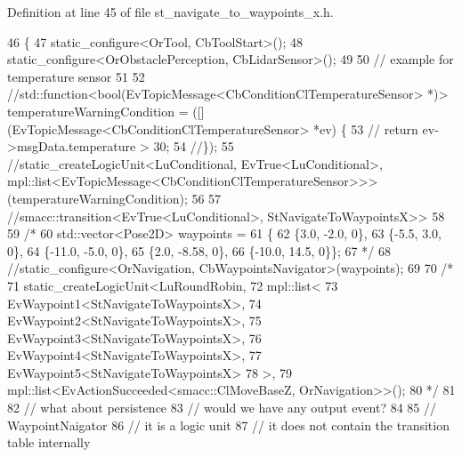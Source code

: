 Definition at line 45 of file st\+\_\+navigate\+\_\+to\+\_\+waypoints\+\_\+x.\+h.


\begin{DoxyCode}
46   \{
47     static\_configure<OrTool, CbToolStart>();
48     static\_configure<OrObstaclePerception, CbLidarSensor>();
49     
50     \textcolor{comment}{// example for temperature sensor}
51 
52     \textcolor{comment}{//std::function<bool(EvTopicMessage<CbConditionClTemperatureSensor> *)> temperatureWarningCondition =
       ([](EvTopicMessage<CbConditionClTemperatureSensor> *ev) \{}
53     \textcolor{comment}{//  return ev->msgData.temperature > 30;}
54     \textcolor{comment}{//\});}
55     \textcolor{comment}{//static\_createLogicUnit<LuConditional, EvTrue<LuConditional>,
       mpl::list<EvTopicMessage<CbConditionClTemperatureSensor>>>(temperatureWarningCondition);}
56 
57     \textcolor{comment}{//smacc::transition<EvTrue<LuConditional>, StNavigateToWaypointsX>>}
58 
59     \textcolor{comment}{/*}
60 \textcolor{comment}{    std::vector<Pose2D> waypoints =}
61 \textcolor{comment}{        \{}
62 \textcolor{comment}{            \{3.0, -2.0, 0\},}
63 \textcolor{comment}{            \{-5.5, 3.0, 0\},}
64 \textcolor{comment}{            \{-11.0, -5.0, 0\},}
65 \textcolor{comment}{            \{2.0, -8.58, 0\},}
66 \textcolor{comment}{            \{-10.0, 14.5, 0\}\};}
67 \textcolor{comment}{*/}
68     \textcolor{comment}{//static\_configure<OrNavigation, CbWaypointsNavigator>(waypoints);}
69 
70     \textcolor{comment}{/*}
71 \textcolor{comment}{    static\_createLogicUnit<LuRoundRobin, }
72 \textcolor{comment}{                              mpl::list<}
73 \textcolor{comment}{                                   EvWaypoint1<StNavigateToWaypointsX>,}
74 \textcolor{comment}{                                   EvWaypoint2<StNavigateToWaypointsX>,}
75 \textcolor{comment}{                                   EvWaypoint3<StNavigateToWaypointsX>, }
76 \textcolor{comment}{                                   EvWaypoint4<StNavigateToWaypointsX>,}
77 \textcolor{comment}{                                   EvWaypoint5<StNavigateToWaypointsX>}
78 \textcolor{comment}{                                  >, }
79 \textcolor{comment}{                         mpl::list<EvActionSucceeded<smacc::ClMoveBaseZ, OrNavigation>>();}
80 \textcolor{comment}{                         */}
81 
82     \textcolor{comment}{// what about persistence}
83     \textcolor{comment}{// would we have any output event?}
84 
85     \textcolor{comment}{// WaypointNaigator}
86     \textcolor{comment}{// it is a logic unit}
87     \textcolor{comment}{// it does not contain the transition table internally}

\end{DoxyCode}
